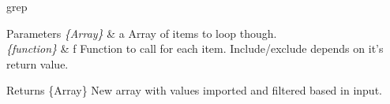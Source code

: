grep 
\begin{DoxyParams}{Parameters}
{\em \{\+Array\}} & a Array of items to loop though. \\
\hline
{\em \{function\}} & f Function to call for each item. Include/exclude depends on it's return value. \\
\hline
\end{DoxyParams}
\begin{DoxyReturn}{Returns}
\{Array\} New array with values imported and filtered based in input.
\end{DoxyReturn}

\begin{DoxyCodeInclude}
\end{DoxyCodeInclude}
 